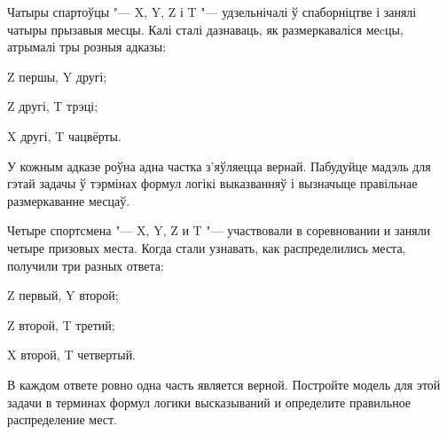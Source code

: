 \begin{problemList}
\bigskip

\problemItemSimple
{Чатыры спартоўцы "--- X, Y, Z і T "--- удзельнічалі ў спаборніцтве і занялі чатыры прызавыя месцы. Калі сталі дазнаваць, як размеркаваліся меcцы, атрымалі тры розныя адказы:
\begin{belarusianEnumerate}
	\item Z першы, Y другі;			
	\item Z другі, T трэці;
	\item X другі, T чацвёрты.
\end{belarusianEnumerate}
У кожным адказе роўна адна частка з'яўляецца вернай. Пабудуйце мадэль для гэтай задачы ў тэрмінах формул логікі выказванняў і вызначыце правільнае размеркаванне месцаў.}
{Четыре спортсмена "--- X, Y, Z и T "--- участвовали в соревновании и заняли четыре призовых места. Когда стали узнавать, как распределились места, получили три разных ответа:
\begin{russianEnumerate}
	\item Z первый, Y второй;			
	\item Z второй, T третий;
	\item X второй, T четвертый.
\end{russianEnumerate}
В каждом ответе ровно одна часть является верной. Постройте модель для этой задачи в терминах формул логики высказываний и определите правильное распределение мест.}

\bigskip


\end{problemList}
